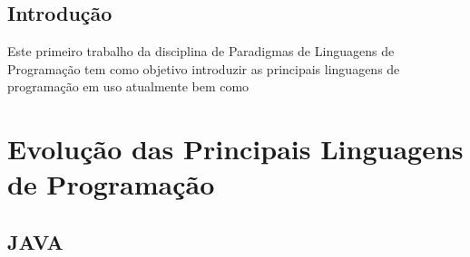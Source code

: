 \documentclass[
    12pt,               %
    openany,            %
    twoside,            %
    a4paper,            %
    brazil              %
    ]{abntex2}
\begin{document}
\frenchspacing 


\imprimircapa

\imprimirfolhaderosto*

\clearpage
{}
\tableofcontents*
\cleardoublepage



\textual

\chapter*[Introdução]{Introdução}

Este primeiro trabalho da disciplina de Paradigmas de Linguagens de Programação
tem como objetivo introduzir as principais linguagens de programação em uso 
atualmente bem como  

\part{Evolução das Principais Linguagens de Programação}

\chapter{JAVA}
\end{document}
